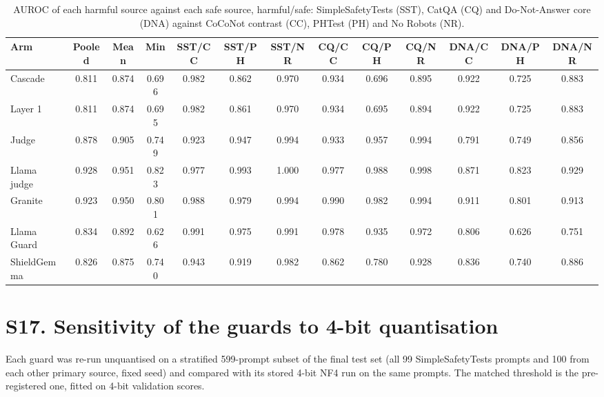 \begin{table}[!htbp]
\caption{AUROC of each harmful source against each safe source, harmful/safe: SimpleSafetyTests (SST), CatQA (CQ) and Do-Not-Answer core (DNA) against CoCoNot contrast (CC), PHTest (PH) and No Robots (NR).}
\label{tab:pairwise}
\centering
\scriptsize
\setlength{\tabcolsep}{3pt}
\begin{tabular}{@{}lcccccccccccc@{}}
\toprule
Arm & Pooled & Mean & Min & SST/CC & SST/PH & SST/NR & CQ/CC & CQ/PH & CQ/NR & DNA/CC & DNA/PH & DNA/NR \\
\midrule
Cascade & 0.811 & 0.874 & 0.696 & 0.982 & 0.862 & 0.970 & 0.934 & 0.696 & 0.895 & 0.922 & 0.725 & 0.883 \\
Layer 1 & 0.811 & 0.874 & 0.695 & 0.982 & 0.861 & 0.970 & 0.934 & 0.695 & 0.894 & 0.922 & 0.725 & 0.883 \\
Judge & 0.878 & 0.905 & 0.749 & 0.923 & 0.947 & 0.994 & 0.933 & 0.957 & 0.994 & 0.791 & 0.749 & 0.856 \\
Llama judge & 0.928 & 0.951 & 0.823 & 0.977 & 0.993 & 1.000 & 0.977 & 0.988 & 0.998 & 0.871 & 0.823 & 0.929 \\
Granite & 0.923 & 0.950 & 0.801 & 0.988 & 0.979 & 0.994 & 0.990 & 0.982 & 0.994 & 0.911 & 0.801 & 0.913 \\
Llama Guard & 0.834 & 0.892 & 0.626 & 0.991 & 0.975 & 0.991 & 0.978 & 0.935 & 0.972 & 0.806 & 0.626 & 0.751 \\
ShieldGemma & 0.826 & 0.875 & 0.740 & 0.943 & 0.919 & 0.982 & 0.862 & 0.780 & 0.928 & 0.836 & 0.740 & 0.886 \\
\bottomrule
\end{tabular}
\end{table}

\section*{S17. Sensitivity of the guards to 4-bit quantisation}

Each guard was re-run unquantised on a stratified 599-prompt subset of the final test set (all 99 SimpleSafetyTests prompts and 100 from each other primary source, fixed seed) and compared with its stored 4-bit NF4 run on the same prompts. The matched threshold is the pre-registered one, fitted on 4-bit validation scores.

